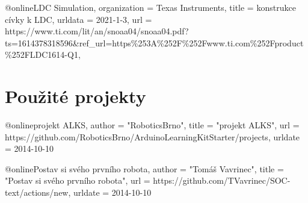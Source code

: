 @online{LDC Simulation,
    organization = {Texas Instruments},
    title        = {konstrukce cívky k LDC},
    urldata      = {2021-1-3},
    url          = {https://www.ti.com/lit/an/\-sn\-oaa04\-/snoaa04.pdf?ts=1614378318596\&ref\_url=https\%253A\%252F\%252F\-www\-.ti.com\%252Fproduct\%252FLDC1614-Q1},
}                                                                                               

\section{Použité projekty}
@online{projekt ALKS,
	author = "RoboticsBrno", %
    title = "projekt ALKS", %
    url = {https://github.com/RoboticsBrno/ArduinoLearningKitStarter/projects},
    urldate = {2014-10-10}
}

    @online{Postav si svého prvního robota,
	author = "Tomáš Vavrinec",
    title = "Postav si svého prvního robota", 
    url = {https://github.com/TVavrinec/SOC-text/actions/new},
    urldate = {2014-10-10}
}   

